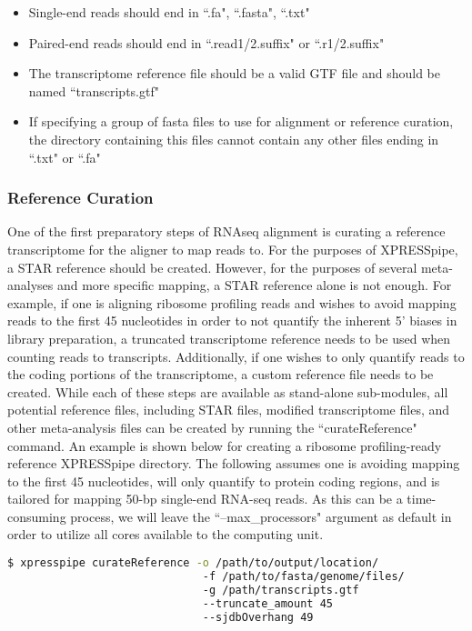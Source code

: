 \documentclass[11pt, a4paper, oneside]{article}
\begin{document}
\begin{itemize}
\item Single-end reads should end in ``.fa", ``.fasta", ``.txt"
\item Paired-end reads should end in ``.read1/2.suffix" or ``.r1/2.suffix"
\item The transcriptome reference file should be a valid GTF file and should be named ``transcripts.gtf"
\item If specifying a group of fasta files to use for alignment or reference curation, the directory containing this files cannot contain any other files ending in ``.txt" or ``.fa"
\end{itemize}

\subsubsection{Reference Curation}
One of the first preparatory steps of RNAseq alignment is curating a reference transcriptome for the aligner to map reads to. For the purposes of XPRESSpipe, a STAR reference should be created. However, for the purposes of several meta-analyses and more specific mapping, a STAR{} reference alone is not enough. For example, if one is aligning ribosome profiling reads and wishes to avoid mapping reads to the first 45 nucleotides in order to not quantify the inherent 5' biases in library preparation{}, a truncated transcriptome reference needs to be used when counting reads to transcripts. Additionally, if one wishes to only quantify reads to the coding portions of the transcriptome, a custom reference file needs to be created. While each of these steps are available as stand-alone sub-modules, all potential reference files, including STAR files, modified transcriptome files, and other meta-analysis files can be created by running the ``curateReference" command. An example is shown below for creating a ribosome profiling-ready reference XPRESSpipe directory. The following assumes one is avoiding mapping to the first 45 nucleotides, will only quantify to protein coding regions, and is tailored for mapping 50-bp single-end RNA-seq reads. As this can be a time-consuming process, we will leave the ``--max\_processors" argument as default in order to utilize all cores available to the computing unit.
\newline
\begin{lstlisting}[language=bash, caption=curateReference example]
$ xpresspipe curateReference -o /path/to/output/location/
                              -f /path/to/fasta/genome/files/
                              -g /path/transcripts.gtf
                              --truncate_amount 45
                              --sjdbOverhang 49
\end{lstlisting}
\end{document}
